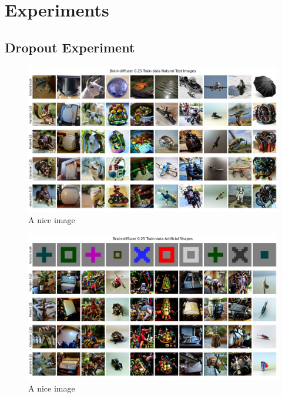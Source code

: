 
\chapter{Experiments}
\section{Dropout Experiment}


\begin{figure}[ht]
   \centering
   \includegraphics[width=1\textwidth]{plots/dropout_qual_eval_bd_test.JPEG}
   \caption{A nice image}\label{fig:dropout_qual_eval_bd_test}
\end{figure}

\begin{figure}[ht]
   \centering
   \includegraphics[width=1\textwidth]{plots/dropout_qual_eval_bd_art.JPEG}
   \caption{A nice image}\label{fig:dropout_qual_eval_bd_art}
\end{figure}

